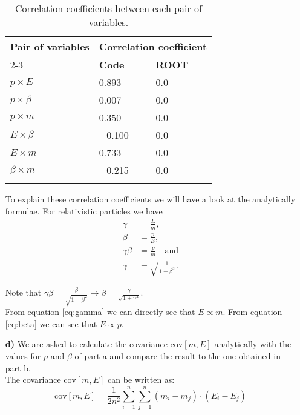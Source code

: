\documentclass[10pt]{article}
\newenvironment{myfont}{\fontfamily{put}\selectfont}{\par}
\begin{document}
\begin{myfont}
\begin{itemize}
    \begin{longtable}{*{3}l}
      \caption[]{Correlation coefficients between each pair of variables. \\ }
      \endfirsthead
      \endhead
      \toprule
      \multirow{2}{*}{\textbf{Pair of variables}} & \multicolumn{2}{c}{\textbf{Correlation coefficient}} \\
      \cmidrule(lr){2-3}
       & \textbf{Code} & \textbf{ROOT} \\
      \midrule
      $p \times E$     & \num{0.893}  & \num{0.0} \\
      $p \times \beta$ & \num{0.007}  & \num{0.0} \\
      $p \times m$     & \num{0.350}  & \num{0.0} \\
      $E \times \beta$ & \num{-0.100} & \num{0.0} \\
      $E \times m$     & \num{0.733}  & \num{0.0} \\
      $\beta \times m$ & \num{-0.215} & \num{0.0} \\
      \bottomrule
      \label{tab:ex_c_coefficients}
    \end{longtable}

    \noindent To explain these correlation coefficients we will have a look at the analytically formulae.
    For relativistic particles we have
    \begin{align}
      \gamma      & = \frac{E}{m}, \label{eq:gamma}\\
      \beta       & = \frac{p}{E}, \label{eq:beta}\\
      \gamma\beta & = \frac{p}{m} \quad \textrm{and} \label{eq:gammabeta}\\
      \gamma      & = \sqrt{\frac{1}{1 - \beta^{2}}}. \label{eq:gamma2}
    \end{align}

    \noindent Note that $\gamma\beta = \frac{\beta}{\sqrt{1-\beta^{2}}} \rightarrow \beta = \frac{\gamma}{\sqrt{1 + \gamma^{2}}}$. \\

    \noindent From equation \ref{eq:gamma} we can directly see that $E \propto m$.
    From equation \ref{eq:beta} we can see that $E \propto p$.

  \item[\textbf{d)}] \label{part_d}
    We are asked to calculate the covariance $\textrm{cov}[m, E]$ analytically with the values for $p$ and $\beta$ of part a and compare the result to the one obtained in part b.\\
   The covariance $\textrm{cov}[m, E]$ can be written as:
   \begin{equation}
   \textrm{cov}[m, E] = \frac{1}{2n^2} \sum_{i=1}^n \sum_{j=1}^n (m_i - m_j) \cdot (E_i - E_j)
   \end{equation}


\end{itemize}
\end{myfont}
\end{document}
